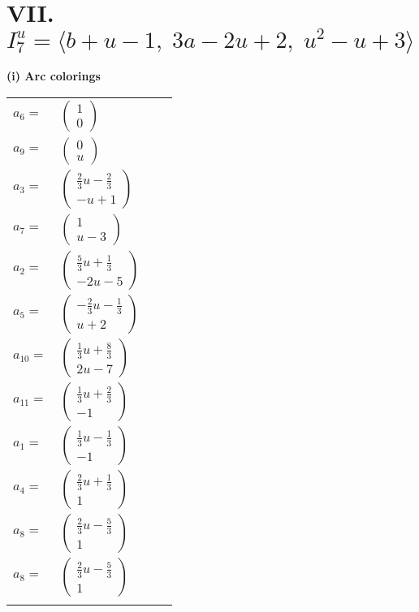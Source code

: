 \documentclass[1p]{elsarticle_modified}
\theoremstyle{definition}
\begin{document}
\centering \section*{VII. $I^u_{7}= \langle b+u-1,\;3 a-2 u+2,\;u^2- u+3 \rangle$}
\flushleft \textbf{(i) Arc colorings}\\
\begin{tabular}{m{7pt} m{180pt} m{7pt} m{180pt} }
\flushright $a_{6}=$&$\begin{pmatrix}1\\0\end{pmatrix}$ \\
\flushright $a_{9}=$&$\begin{pmatrix}0\\u\end{pmatrix}$ \\
\flushright $a_{3}=$&$\begin{pmatrix}\frac{2}{3} u-\frac{2}{3}\\- u+1\end{pmatrix}$ \\
\flushright $a_{7}=$&$\begin{pmatrix}1\\u-3\end{pmatrix}$ \\
\flushright $a_{2}=$&$\begin{pmatrix}\frac{5}{3} u+\frac{1}{3}\\-2 u-5\end{pmatrix}$ \\
\flushright $a_{5}=$&$\begin{pmatrix}-\frac{2}{3} u-\frac{1}{3}\\u+2\end{pmatrix}$ \\
\flushright $a_{10}=$&$\begin{pmatrix}\frac{1}{3} u+\frac{8}{3}\\2 u-7\end{pmatrix}$ \\
\flushright $a_{11}=$&$\begin{pmatrix}\frac{1}{3} u+\frac{2}{3}\\-1\end{pmatrix}$ \\
\flushright $a_{1}=$&$\begin{pmatrix}\frac{1}{3} u-\frac{1}{3}\\-1\end{pmatrix}$ \\
\flushright $a_{4}=$&$\begin{pmatrix}\frac{2}{3} u+\frac{1}{3}\\1\end{pmatrix}$ \\
\flushright $a_{8}=$&$\begin{pmatrix}\frac{2}{3} u-\frac{5}{3}\\1\end{pmatrix}$\\ \flushright $a_{8}=$&$\begin{pmatrix}\frac{2}{3} u-\frac{5}{3}\\1\end{pmatrix}$\\&\end{tabular}
\end{document}
